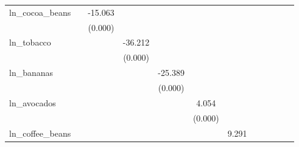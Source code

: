 \begin{table}[htbp]
\begin{tabular}{l*{11}{c}}
\addlinespace
ln\_cocoa\_beans&                     &     -15.063\sym{***}&                     &                     &                     &                     &                     &                     &                     &                     &                     \\
            &                     &     (0.000)         &                     &                     &                     &                     &                     &                     &                     &                     &                     \\
\addlinespace
ln\_tobacco  &                     &                     &     -36.212\sym{***}&                     &                     &                     &                     &                     &                     &                     &                     \\
            &                     &                     &     (0.000)         &                     &                     &                     &                     &                     &                     &                     &                     \\
\addlinespace
ln\_bananas  &                     &                     &                     &     -25.389\sym{***}&                     &                     &                     &                     &                     &                     &                     \\
            &                     &                     &                     &     (0.000)         &                     &                     &                     &                     &                     &                     &                     \\
\addlinespace
ln\_avocados &                     &                     &                     &                     &       4.054\sym{***}&                     &                     &                     &                     &                     &                     \\
            &                     &                     &                     &                     &     (0.000)         &                     &                     &                     &                     &                     &                     \\
\addlinespace
ln\_coffee\_beans&                     &                     &                     &                     &                     &       9.291\sym{***}&                     &                     &                     &                     &                     \\

\end{tabular}
\end{table}
